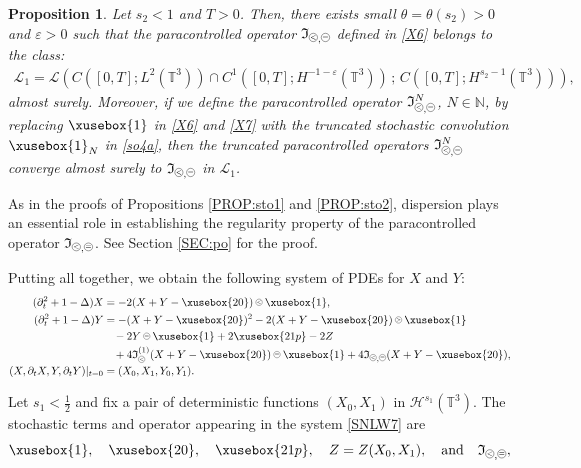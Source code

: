 \documentclass[%
11pt,  reqno]{amsart}
\def\<#1>{\xusebox{#1}}
\newcommand{\pe}{\mathbin{\scaleobj{0.7}{\tikz \draw (0,0) node[shape=circle,draw,inner sep=0pt,minimum size=8.5pt] {\scriptsize  $=$};}}}
\newcommand{\pl}{\mathbin{\scaleobj{0.7}{\tikz \draw (0,0) node[shape=circle,draw,inner sep=0pt,minimum size=8.5pt] {\scriptsize $<$};}}}
\newcommand{\pg}{\mathbin{\scaleobj{0.7}{\tikz \draw (0,0) node[shape=circle,draw,inner sep=0pt,minimum size=8.5pt] {\scriptsize $>$};}}}
\newtheorem{proposition}[theorem]{Proposition}
\newcommand{\1}{\hspace{0.2mm}\text{I}\hspace{0.2mm}}
\newcommand{\noi}{\noindent}
\newcommand{\T}{\mathbb{T}}
\renewcommand{\L}{\mathcal{L}}
\newcommand{\Dl}{\Delta}
\newcommand{\eps}{\varepsilon}
\newcommand{\dt}{\partial_t}
\newcommand{\N}{\mathbb{N}}
\renewcommand{\H}{\mathcal{H}}
\newcommand{\If}{\mathfrak{I}}
\numberwithin{equation}{section}
\numberwithin{theorem}{section}
\begin{document}
\begin{proposition}\label{PROP:sto4}
Let  $ s_2 < 1$ and $T > 0$.
Then, there exists small $\theta = \theta (s_2) > 0$
and $\eps > 0$
such that
the paracontrolled operator $\If_{\pl, \pe}$ 
defined in \eqref{X6}
belongs to  the class:
\begin{align}
\L_1 = \L(C([0, T]; L^2(\T^3) ) \cap C^1([0,T];H^{-1 -\eps}(\T^3))
\, ;\, 
 C([0, T]; H^{s_2 -1}(\T^3) )),
\label{L2}
\end{align}
almost surely.
Moreover, 
if we define  the paracontrolled operator $\If_{\pl, \pe}^N$, $N \in \N$, 
by replacing 
$\<1>$ in \eqref{X6} and \eqref{X7}
with the truncated stochastic convolution $\<1>_N$ in \eqref{so4a}, 
then
the truncated paracontrolled operators $\If_{\pl, \pe}^N$ converge almost surely to $\If_{\pl, \pe}$ 
in $\L_1$.
\end{proposition}



As in the proofs of Propositions \ref{PROP:sto1} and \ref{PROP:sto2}, 
dispersion plays an essential role in 
establishing the regularity property
of  the paracontrolled operator $\If_{\pl, \pe}$.
See Section \ref{SEC:po} for the proof.

Putting all together, we obtain the following system 
of PDEs for $X$ and $Y$:
\begin{align}
\begin{split}
 (\dt^2  + 1- \Dl) X  &  = - 2 (X+Y-\<20>)\pl \<1>, \\
 (\dt^2 +  1- \Dl) Y  
&   = - (X+Y-\<20>)^2 -  2(X+Y-\<20>)\pg \<1>\\
& \hphantom{X} 
  - 2 Y\pe \<1> + 2 \<21p>
 -2Z \\ 
& \hphantom{X} 
+  4 \If_{\pl}^{(1)}(X + Y - \<20>)\pe \<1> +4 \If_{\pl, \pe}(X + Y - \<20>), \\
(X,  \dt X, Y,     \dt Y)|_{t = 0} & = (X_0, X_1, Y_0, Y_1).
\end{split} 
 \label{SNLW7}
\end{align}





\noi
Let $s_1 < \frac 12$
and fix a pair of deterministic functions  $(X_0, X_1)$ in  $\H^{s_1}(\T^3)$.
The stochastic terms and operator appearing in the system \eqref{SNLW7} are 
\begin{align}
\<1>,\quad \<20>,\quad  \<21p>,
\quad  
Z = Z(X_0, X_1), 
\quad 
\text{and} 
\quad \If_{\pl, \pe}, 
\label{so5}
\end{align}
\end{document}

